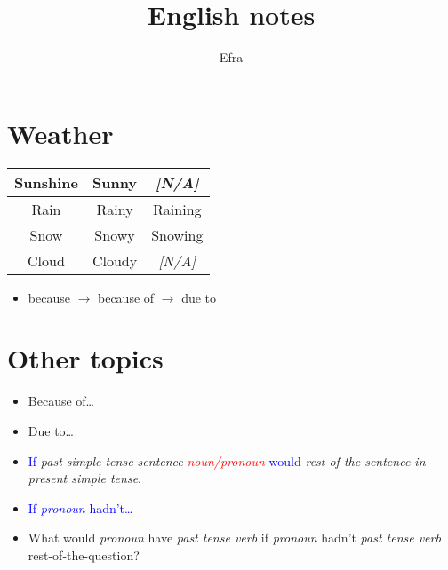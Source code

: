 \documentclass[11pt]{article} %
\title{English notes}
\author{Efra}
\begin{document}
\maketitle
\tableofcontents







\section{Weather}
\begin{multicols}{2}
\begin{tabular}{|c|c|c|}
\hline
Sunshine & Sunny & \emph{[N/A]} \\
\hline
Rain & Rainy & Raining\\
\hline
Snow & Snowy & Snowing\\
\hline
Cloud & Cloudy & \emph{[N/A]}\\
\hline
\end{tabular}

\begin{itemize}
\item because $\rightarrow$ because of $\rightarrow$ due to
\end{itemize}
\end{multicols}



\section{Other topics}
\begin{multicols}{2}
\begin{itemize}
\item Because of\dots
\item Due to\dots
\item \textcolor{blue}{If} \emph{past simple tense sentence} \textcolor{red}{\emph{noun/pronoun}} \textcolor{blue}{would} \emph{rest of the sentence in present simple tense}.
\item \textcolor{blue}{If \emph{pronoun} hadn't\dots}
\item What would \emph{pronoun} have \emph{past tense verb} if \emph{pronoun} hadn't \emph{past tense verb} rest-of-the-question?
\end{itemize}
\end{multicols}




\end{document}
